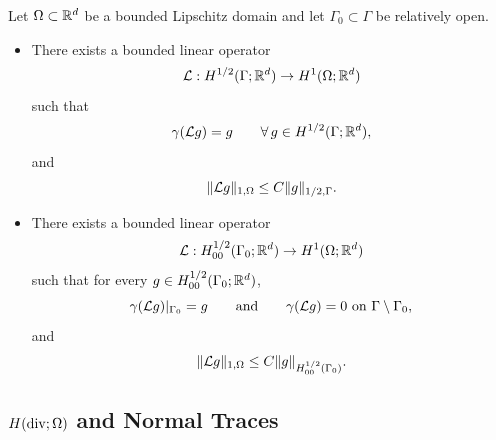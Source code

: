\begin{theorem}\label{thm:lifting}
	Let $\Omega\subset{\mathbb R}^d$ be a bounded Lipschitz domain and let $\Gamma_0\subset\Gamma$ be relatively open.

	\begin{itemize}
		\item[i)] There exists a bounded linear operator
		      \begin{equation*}
			      {\mathcal L}:H^{1/2}(\Gamma;{\mathbb R}^d)\to H^1(\Omega;{\mathbb R}^d)
		      \end{equation*}
		      such that
		      \begin{equation*}
			      \gamma({\mathcal L} g)=g
			      \qquad\forall\,g\in H^{1/2}(\Gamma;{\mathbb R}^d),
		      \end{equation*}
		      and
		      \begin{equation*}
			      \|{\mathcal L} g\|_{1,\Omega}\le C\|g\|_{1/2,\Gamma}.
		      \end{equation*}

		\item[ii)] There exists a bounded linear operator
		      \begin{equation*}
			      {\mathcal L}:H^{1/2}_{00}(\Gamma_0;{\mathbb R}^d)\to H^1(\Omega;{\mathbb R}^d)
		      \end{equation*}
		      such that for every $g\in H^{1/2}_{00}(\Gamma_0;{\mathbb R}^d)$,
		      \begin{equation*}
			      \gamma({\mathcal L} g)|_{\Gamma_0}=g
			      \qquad\text{and}\qquad
			      \gamma({\mathcal L} g)=0\ \text{on }\Gamma\setminus\Gamma_0,
		      \end{equation*}
		      and
		      \begin{equation*}
			      \|{\mathcal L} g\|_{1,\Omega}\le C\|g\|_{H^{1/2}_{00}(\Gamma_0)}.
		      \end{equation*}
	\end{itemize}
\end{theorem}

\subsection{\texorpdfstring{$H(\diver;\Omega)$}{Hdiv} and Normal Traces}\label{subsec:Hdiv}

